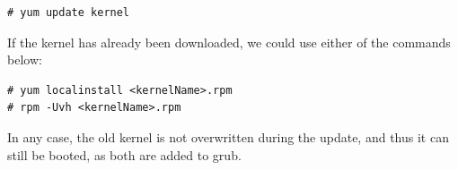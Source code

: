 \vspace{-15pt}
\begin{verbatim}
# yum update kernel
\end{verbatim}
\vspace{-10pt}

\noindent
If the kernel has already been downloaded, we could use either of the commands below:

\vspace{-15pt}
\begin{verbatim}
# yum localinstall <kernelName>.rpm
# rpm -Uvh <kernelName>.rpm
\end{verbatim}
\vspace{-10pt}

In any case, the old kernel is not overwritten during the update, and thus it can still be booted, as both are added to grub. 